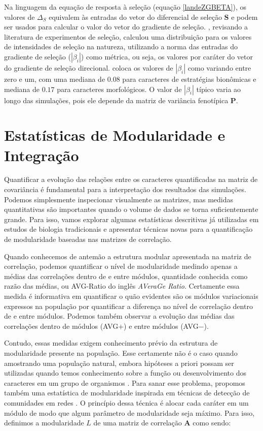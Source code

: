 Na linguagem da equação de resposta à seleção (equação
\ref{landeZGBETA}), os valores de $\Delta_S$ equivalem às entradas do
vetor do diferencial de seleção $\mathbf{S}$ e podem ser usados para
calcular o valor do vetor do gradiente de seleção.
\cite{Kingsolver2001}, revisando a literatura de experimentos de
seleção, calculou uma distribuição para os valores de intensidades de
seleção na natureza, utilizando a norma das entradas do gradiente de seleção
($|\beta_i|$) como métrica, ou seja, os valores por caráter do vetor do
gradiente de seleção direcional.
\cite{Kingsolver2001} coloca os valores de
$|\beta_i|$ como variando entre zero e um, com uma mediana de $0.08$
para caracteres de estratégias bionômicas e mediana de $0.17$ para
caracteres morfológicos.
O valor de $|\beta_i|$ típico varia ao longo das simulações, pois ele
depende da matriz de variância fenotípica $\mathbf{P}$.

\section{Estatísticas de Modularidade e Integração}

Quantificar a evolução das relações entre os caracteres quantificadas na
matriz de covariância é fundamental para a interpretação dos resultados
das simulações.
Podemos simplesmente inspecionar visualmente as matrizes, mas medidas
quantitativas são importantes quando o volume de dados se torna
suficientemente grande.
Para isso, vamos explorar algumas estatísticas descritivas já utilizadas em
estudos de biologia tradicionais e apresentar técnicas novas para a
quantificação de modularidade baseadas nas matrizes de correlação.

Quando conhecemos de antemão a estrutura modular apresentada na matriz
de correlação, podemos quantificar o nível de modularidade medindo
apenas a médias das correlações dentro de e entre módulos, quantidade
conhecida como razão das médias, ou AVG-Ratio do inglês {\it AVeraGe Ratio}.
Certamente essa medida é informativa em quantificar o quão evidentes são
os módulos variacionais expressos na população por quantificar a
diferença no nível de correlação dentro de e entre módulos.
Podemos também observar a evolução das médias das correlações dentro
de módulos (AVG$+$) e entre módulos (AVG$-$).

Contudo, essas medidas exigem conhecimento prévio da estrutura de
modularidade presente na população.
Esse certamente não é o caso quando amostrando uma população natural,
embora hipóteses a priori possam ser utilizadas quando temos conhecimento
sobre a função ou desenvolvimento dos caracteres em um grupo de
organismos \citep{Cheverud1985a, Marroig2001}.
Para sanar esse problema, propomos também uma estatística de
modularidade inspirada em técnicas de detecção de comunidades em redes
\citep{Newman2006,Newman2006a,Reichardt2006}.
O princípio dessa técnica é alocar cada caráter em um módulo de modo que
algum parâmetro de modularidade seja máximo.
Para isso, definimos a modularidade $L$ de uma matriz de correlação
$\mathbf{A}$
como sendo:

